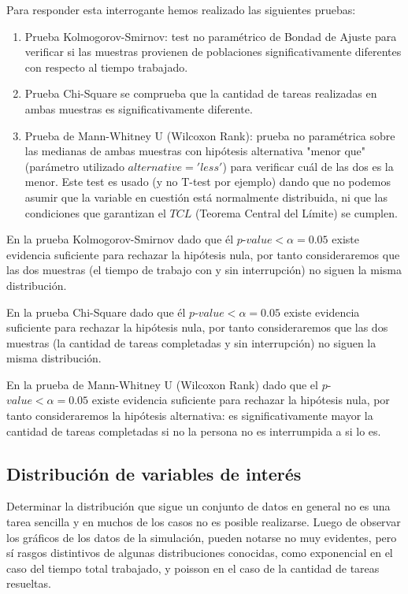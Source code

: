 \documentclass[10pt,a4paper,twocolumn]{article}
\begin{document}
Para responder esta interrogante hemos realizado las siguientes pruebas:
\begin{enumerate}
    \item Prueba Kolmogorov-Smirnov: test no paramétrico de Bondad de Ajuste para verificar si las muestras provienen de poblaciones significativamente diferentes con respecto al tiempo trabajado.
    \item Prueba Chi-Square se comprueba que la cantidad de tareas realizadas en ambas muestras es significativamente diferente.
    \item Prueba de Mann-Whitney U (Wilcoxon Rank): prueba no paramétrica sobre las medianas de ambas muestras con hipótesis alternativa "menor que"  (par\'ametro utilizado $alternative = 'less'$) para verificar cu\'al de las dos es la menor. Este test es usado (y no T-test por ejemplo) dando que no podemos asumir que la variable en cuestión está normalmente distribuida, ni que las condiciones que garantizan el $TCL$ (Teorema Central del L\'imite) se cumplen.
\end{enumerate}


En la prueba Kolmogorov-Smirnov dado que \'el $p$-$value < \alpha = 0.05$ existe evidencia suficiente para rechazar la hipótesis nula, por tanto consideraremos que las dos muestras (el tiempo de trabajo con y sin interrupción) no siguen la misma distribución.

En la prueba Chi-Square dado que \'el $p$-$value < \alpha = 0.05$ existe evidencia suficiente para rechazar la hipótesis nula, por tanto consideraremos que las dos muestras (la cantidad de tareas completadas y sin interrupción) no siguen la misma distribución.

En la prueba de Mann-Whitney U (Wilcoxon Rank) dado que el $p$-$value < \alpha = 0.05$ existe evidencia suficiente para rechazar la hipótesis nula, por tanto consideraremos la hipótesis alternativa: es significativamente mayor la cantidad de tareas completadas si no la persona no es interrumpida a si lo es.

\subsection{Distribuci\'on de variables de inter\'es}

Determinar la distribución que sigue un conjunto de datos en general no es una tarea sencilla y en muchos de los casos no es posible realizarse. Luego de observar los gráficos de los datos de la simulación, pueden notarse no muy evidentes, pero sí rasgos distintivos de algunas distribuciones conocidas, como exponencial en el caso del tiempo total trabajado, y poisson en el caso de la cantidad de tareas resueltas. 
\end{document}
